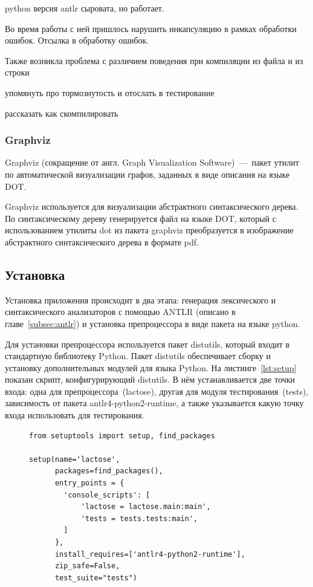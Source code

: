 \documentclass[12pt,a4paper,oneside]{extarticle}
\begin{document}
            python версия antlr сыровата, но работает.

            Во время работы с ней пришлось нарушить инкапсуляцию в рамках обработки ошибок. Отсылка в обработку ошибок.

            Также возникла проблема с различием поведения при компиляции из файла и из строки %

            упомянуть про тормознутость и отослать в тестирование

            рассказать как скомпилировать
        \subsubsection{Graphviz}
            Graphviz (сокращение от англ. Graph Visualization Software)~---~пакет утилит по автоматической визуализации графов, заданных в виде описания на языке DOT.

            Graphviz используется для визуализации абстрактного синтаксического дерева.
            По синтаксическому дереву генерируется файл на языке DOT, который с использованием утилиты dot из пакета graphviz преобразуется в изображение абстрактного синтаксического дерева в формате pdf.
    \clearpage

    \subsection{Установка}
        Установка приложения происходит в два этапа: генерация лексического и синтаксического анализаторов с помощью ANTLR (описано в главе~\ref{subsec:antlr}) и установка препроцессора в виде пакета на языке python.
        
        Для установки препроцессора используется пакет distutils, который входит в стандартную библиотеку Python.
        Пакет distutils обеспечивает сборку и установку дополнительных модулей для языка Python.
        На листинге~\ref{lst:setup} показан скрипт, конфигурирующий distutils.
        В нём устанавливается две точки входа: одна для препроцессора~(lactose), другая для модуля тестирования~(tests), зависимость от пакета antlr4-python2-runtime, а также указывается какую точку входа использовать для тестирования.

        \begin{figure}[h!]  
            \begin{lstlisting}[label={lst:setup},caption={Cкрипт конфигурации для утилиты distutils},captionpos=b]
from setuptools import setup, find_packages

setup(name='lactose',
      packages=find_packages(),
      entry_points = {
        'console_scripts': [
            'lactose = lactose.main:main',
            'tests = tests.tests:main',
        ]
      },
      install_requires=['antlr4-python2-runtime'],
      zip_safe=False,
      test_suite="tests")

            \end{lstlisting}
        \end{figure}
\end{document}
